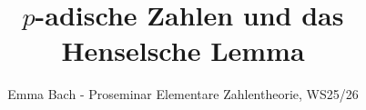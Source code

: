 \documentclass[9pt]{article}
\begin{document}
	\setcounter{hahaone}{1}
	
	\newtheorem{lemma}{Lemma}[hahaone]
	\newtheorem{theorem}[lemma]{Satz}
	\newtheorem{proposition}[lemma]{Proposition}
	\newtheorem{corollary}[lemma]{Korollar}
	\newtheorem{application}[lemma]{Anwendung}
	
	\theoremstyle{definition}
	\newtheorem{definition}[lemma]{Definition}
	\newtheorem{example}[lemma]{Beispiel}
	
	\title{\Large\vspace{-3cm}\textbf{$p$-adische Zahlen und das Henselsche Lemma}}
	\author{Emma Bach - Proseminar Elementare Zahlentheorie, WS25/26}
	
	\maketitle
	
\end{document}
